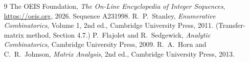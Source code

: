 \documentclass[11pt,a4paper]{article}
\theoremstyle{plain}
\theoremstyle{definition}
\begin{document}
\begin{thebibliography}{9}
 The OEIS Foundation, \emph{The On-Line Encyclopedia of Integer
Sequences}, \url{https://oeis.org}, 2026. Sequence A231998.
 R.~P.~Stanley, \emph{Enumerative Combinatorics}, Volume 1, 2nd ed.,
Cambridge University Press, 2011. (Transfer-matrix method, Section 4.7.)
 P.~Flajolet and R.~Sedgewick, \emph{Analytic Combinatorics}, Cambridge
University Press, 2009.
 R.~A.~Horn and C.~R.~Johnson, \emph{Matrix Analysis}, 2nd ed., Cambridge
University Press, 2013.
\end{thebibliography}
\end{document}
